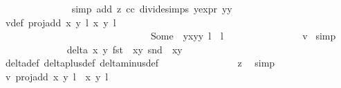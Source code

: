 \begin{isabellebody}
\ \ \ \ \ \ \ \ \ \ \ \ \ \ \isamarkupfalse%
{\isacharparenleft}simp\ add{\isacharcolon}\ z{}\ cc\ divide{\isacharunderscore}simps\ y{\isacharunderscore}expr\ {\isacartoucheopen}y{\isacharasterisk}y\ {\isacharequal}\ {}{\isacartoucheclose}{\isacharparenright}\isanewline
\ \ \ \ \ \ \ \ \ \ \ \ \isamarkupfalse%
\ \isamarkupfalse%
\ v{}{\isacharunderscore}def{\isacharcolon}\ {\isachardoublequoteopen}proj{\isacharunderscore}add\ {\isacharparenleft}{\isacharparenleft}x{\isacharcomma}\ y{\isacharparenright}{\isacharcomma}\ l{\isacharparenright}\ {\isacharparenleft}{\isacharparenleft}x{\isacharprime}{\isacharcomma}\ y{\isacharprime}{\isacharparenright}{\isacharcomma}\ l{\isacharprime}{\isacharparenright}\ {\isacharequal}\ \isanewline
\ \ \ \ \ \ \ \ \ \ \ \ \ \ \ \ \ \ \ \ \ \ \ \ \ \ \ \ \ \ \ Some\ {\isacharparenleft}{\isasymrho}\ {\isacharparenleft}y{\isacharasterisk}x{\isacharprime}{\isacharcomma}y{\isacharasterisk}y{\isacharprime}{\isacharparenright}{\isacharcomma}\ l\ {\isacharplus}\ l{\isacharprime}{\isacharparenright}{\isachardoublequoteclose}\isanewline
\ \ \ \ \ \ \ \ \ \ \ \ \ \ \isamarkupfalse%
\ v{}\ \isamarkupfalse%
{\isacharparenleft}simp{\isacharparenright}\isanewline
\ \ \ \ \ \ \ \ \ \ \ \ \isamarkupfalse%
\ {\isachardoublequoteopen}delta\ x\ y\ {\isacharparenleft}fst\ {\isacharparenleft}{\isasymtau}\ {\isacharparenleft}x{\isacharprime}{\isacharcomma}y{\isacharprime}{\isacharparenright}{\isacharparenright}{\isacharparenright}\ {\isacharparenleft}snd\ {\isacharparenleft}{\isasymtau}\ {\isacharparenleft}x{\isacharprime}{\isacharcomma}y{\isacharprime}{\isacharparenright}{\isacharparenright}{\isacharparenright}\ {\isasymnoteq}\ {}{\isachardoublequoteclose}\isanewline
\ \ \ \ \ \ \ \ \ \ \ \ \ \ \isamarkupfalse%
\ delta{\isacharunderscore}def\ delta{\isacharunderscore}plus{\isacharunderscore}def\ delta{\isacharunderscore}minus{\isacharunderscore}def\isanewline
\ \ \ \ \ \ \ \ \ \ \ \ \ \ \isamarkupfalse%
\ z{}\ \isamarkupfalse%
\ simp\isanewline
\ \ \ \ \ \ \ \ \ \ \ \ \isamarkupfalse%
\ \isamarkupfalse%
\ v{}{\isacharcolon}\ {\isachardoublequoteopen}proj{\isacharunderscore}add\ {\isacharparenleft}{\isacharparenleft}x{\isacharcomma}\ y{\isacharparenright}{\isacharcomma}\ l{\isacharparenright}\ {\isacharparenleft}{\isasymtau}\ {\isacharparenleft}x{\isacharprime}{\isacharcomma}\ y{\isacharprime}{\isacharparenright}{\isacharcomma}\ l{\isacharprime}\ {\isacharplus}\ {}{\isacharparenright}\ {\isacharequal}\ \isanewline

\end{isabellebody}
